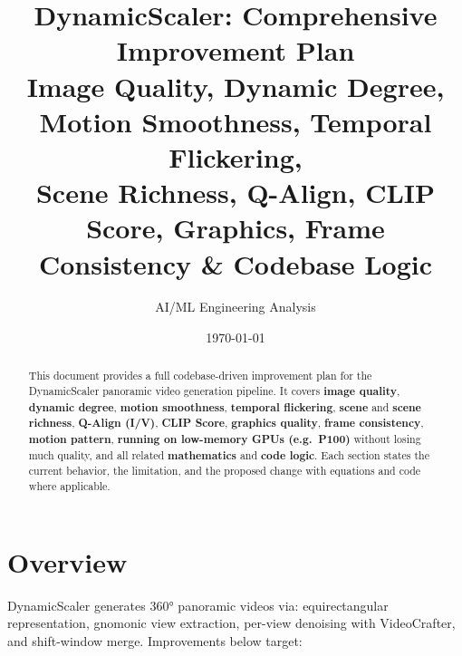 \documentclass[11pt,a4paper]{article}
\title{
    \textbf{DynamicScaler: Comprehensive Improvement Plan} \\
    \large Image Quality, Dynamic Degree, Motion Smoothness, Temporal Flickering, \\
    Scene Richness, Q-Align, CLIP Score, Graphics, Frame Consistency \& Codebase Logic
}
\author{AI/ML Engineering Analysis}
\date{\today}
\begin{document}
\maketitle

\begin{abstract}
This document provides a full codebase-driven improvement plan for the DynamicScaler panoramic video generation pipeline. It covers \textbf{image quality}, \textbf{dynamic degree}, \textbf{motion smoothness}, \textbf{temporal flickering}, \textbf{scene} and \textbf{scene richness}, \textbf{Q-Align (I/V)}, \textbf{CLIP Score}, \textbf{graphics quality}, \textbf{frame consistency}, \textbf{motion pattern}, \textbf{running on low-memory GPUs (e.g.\ P100)} without losing much quality, and all related \textbf{mathematics} and \textbf{code logic}. Each section states the current behavior, the limitation, and the proposed change with equations and code where applicable.
\end{abstract}

\tableofcontents
\newpage

\section{Overview}

DynamicScaler generates 360° panoramic videos via: equirectangular representation, gnomonic view extraction, per-view denoising with VideoCrafter, and shift-window merge. Improvements below target:
\end{document}
